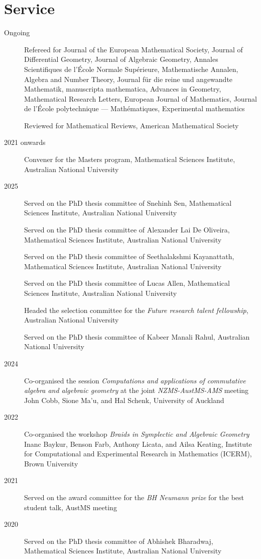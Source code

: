 \documentclass[11pt]{article}
\begin{document}
\section*{Service}
\label{sec:orgbae2618}

\label{orgead0b88}
\begin{description}
\item[{Ongoing}] Refereed for Journal of the European Mathematical Society, Journal of Differential Geometry, Journal of Algebraic Geometry, Annales Scientifiques de l'École Normale Supérieure, Mathematische Annalen, Algebra and Number Theory, Journal für die reine und angewandte Mathematik, manuscripta mathematica, Advances in Geometry, Mathematical Research Letters, European Journal of Mathematics, Journal de l'École polytechnique — Mathématiques, Experimental mathematics

Reviewed for Mathematical Reviews, American Mathematical Society
\item[{2021 onwards}] Convener for the Masters program, Mathematical Sciences Institute, Australian National University
\item[{2025}] Served on the PhD thesis committee of Snehinh Sen, Mathematical Sciences Institute, Australian National University

Served on the PhD thesis committee of Alexander Lai De Oliveira, Mathematical Sciences Institute, Australian National University

Served on the PhD thesis committee of Seethalakshmi Kayanattath, Mathematical Sciences Institute, Australian National University

Served on the PhD thesis committee of Lucas Allen, Mathematical Sciences Institute, Australian National University

Headed the selection committee for the \emph{Future research talent fellowship}, Australian National University

Served on the PhD thesis committee of Kabeer Manali Rahul, Australian National University
\item[{2024}] Co-organised the session \emph{Computations and applications of commutative algebra and algebraic geometry} at the joint \emph{NZMS-AustMS-AMS} meeting John Cobb, Sione Ma'u, and Hal Schenk, University of Auckland
\item[{2022}] Co-organised the workshop \emph{Braids in Symplectic and Algebraic Geometry} Inanc Baykur, Benson Farb, Anthony Licata, and Ailsa Keating, Institute for Computational and Experimental Research in Mathematics (ICERM), Brown University
\item[{2021}] Served on the award committee for the \emph{BH Neumann prize} for the best student talk, AustMS meeting
\item[{2020}] Served on the PhD thesis committee of Abhishek Bharadwaj, Mathematical Sciences Institute, Australian National University


\end{description}
\end{document}
